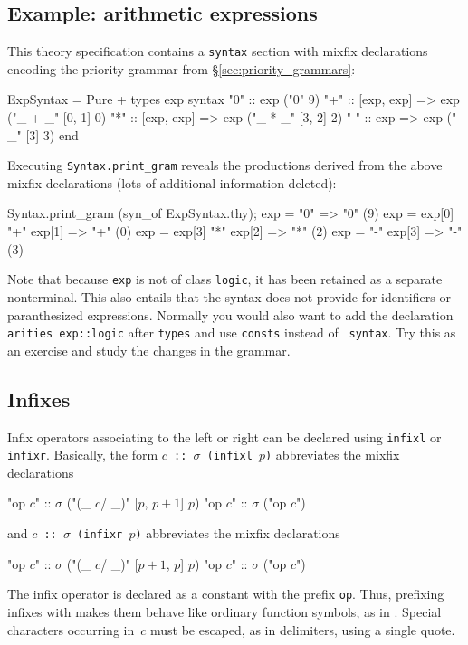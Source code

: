 \subsection{Example: arithmetic expressions}
This theory specification contains a {\tt syntax} section with mixfix
declarations encoding the priority grammar from
\S\ref{sec:priority_grammars}:
\begin{ttbox}
ExpSyntax = Pure +
types
  exp
syntax
  "0" :: exp                 ("0"      9)
  "+" :: [exp, exp] => exp   ("_ + _"  [0, 1] 0)
  "*" :: [exp, exp] => exp   ("_ * _"  [3, 2] 2)
  "-" :: exp => exp          ("- _"    [3] 3)
end
\end{ttbox}
Executing {\tt Syntax.print_gram} reveals the productions derived from the
above mixfix declarations (lots of additional information deleted):
\begin{ttbox}
Syntax.print_gram (syn_of ExpSyntax.thy);
{\out exp = "0"  => "0" (9)}
{\out exp = exp[0] "+" exp[1]  => "+" (0)}
{\out exp = exp[3] "*" exp[2]  => "*" (2)}
{\out exp = "-" exp[3]  => "-" (3)}
\end{ttbox}

Note that because {\tt exp} is not of class {\tt logic}, it has been
retained as a separate nonterminal.  This also entails that the syntax
does not provide for identifiers or paranthesized expressions.
Normally you would also want to add the declaration {\tt arities
  exp::logic} after {\tt types} and use {\tt consts} instead of {\tt
  syntax}.  Try this as an exercise and study the changes in the
grammar.


\subsection{Infixes}

Infix operators associating to the left or right can be declared using
{\tt infixl} or {\tt infixr}.  Basically, the form {\tt $c$ ::\ 
  $\sigma$ (infixl $p$)} abbreviates the mixfix declarations
\begin{ttbox}
"op \(c\)" :: \(\sigma\)   ("(_ \(c\)/ _)" [\(p\), \(p+1\)] \(p\))
"op \(c\)" :: \(\sigma\)   ("op \(c\)")
\end{ttbox}
and {\tt $c$ ::\ $\sigma$ (infixr $p$)} abbreviates the mixfix declarations
\begin{ttbox}
"op \(c\)" :: \(\sigma\)   ("(_ \(c\)/ _)" [\(p+1\), \(p\)] \(p\))
"op \(c\)" :: \(\sigma\)   ("op \(c\)")
\end{ttbox}
The infix operator is declared as a constant with the prefix {\tt op}.
Thus, prefixing infixes with \sdx{op} makes them behave like ordinary
function symbols, as in \ML.  Special characters occurring in~$c$ must be
escaped, as in delimiters, using a single quote.


